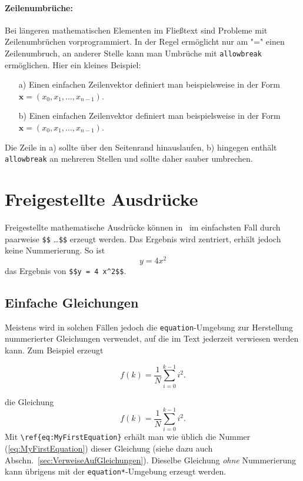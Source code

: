\paragraph{Zeilenumbrüche:}
Bei längeren mathematischen Elementen im Fließtext sind Probleme mit Zeilenumbrüchen
vorprogrammiert. In der Regel ermöglicht \latex nur am "=" einen Zeilenumbruch,
an anderer Stelle kann man Umbrüche mit \texttt{{\bs}allowbreak} ermöglichen. 
Hier ein kleines Beispiel:
%
\begin{itemize}
\item[a)] Einen einfachen Zeilenvektor definiert man beispielsweise in der Form 
		$\boldsymbol{x} = (x_0, x_1, \ldots, x_{n-1})$.
\item[b)] Einen einfachen Zeilenvektor definiert man beispielsweise in der Form 
	$\boldsymbol{x} = (x_0,\allowbreak x_1,\allowbreak\ldots,\allowbreak x_{n-1})$.
\end{itemize}
Die Zeile in a) sollte über den Seitenrand hinauslaufen, b) hingegen enthält
\texttt{{\bs}allowbreak} an mehreren Stellen und sollte daher sauber umbrechen.


\section{Freigestellte Ausdrücke}

Freigestellte mathematische Ausdrücke können in \latex\ im einfachsten Fall durch paarweise 
\verb!$$! \ldots \verb!$$! erzeugt werden. Das Ergebnis wird zentriert, erhält jedoch keine 
Nummerierung. So ist \zB\ $$y = 4 x^2$$ das Ergebnis von \verb!$$y = 4 x^2$$!.


\subsection{Einfache Gleichungen} 

Meistens wird in solchen Fällen jedoch die \texttt{equation}-Umgebung zur Herstellung nummerierter 
Gleichungen verwendet, auf die im Text jederzeit verwiesen werden kann. Zum Beispiel erzeugt
%
\begin{LaTeXCode}[numbers=none]
\begin{equation}
  f(k) = \frac{1}{N} \sum_{i=0}^{k-1} i^2 . 
  \label{eq:MyFirstEquation}
\end{equation}
\end{LaTeXCode}
%
die Gleichung
%
\begin{equation}
  f(k) = \frac{1}{N} \sum_{i=0}^{k-1} i^2 . 
\label{eq:MyFirstEquation}
\end{equation}
%
Mit \verb!\ref{eq:MyFirstEquation}! erhält man wie üblich die Nummer (\ref{eq:MyFirstEquation}) dieser Gleichung (siehe dazu auch Abschn.\ \ref{sec:VerweiseAufGleichungen}). 
Dieselbe Gleichung \emph{ohne} Nummerierung kann übrigens mit der \texttt{equation*}-Umgebung erzeugt werden.



